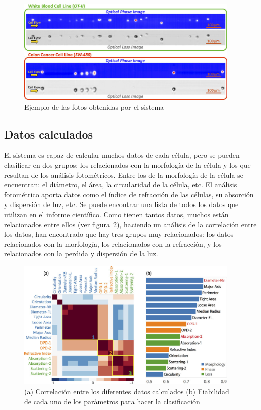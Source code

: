 \documentclass[a4paper, 12pt, UTF8]{article}
\begin{document}
\begin{figure}[H]
	\centering
	\includegraphics[width=0.95\textwidth]{Phase}
	\caption{Ejemplo de las fotos obtenidas por el sistema}
	\label{fig:phase}
\end{figure}

\subsection{Datos calculados}
El sistema es capaz de calcular muchos datos de cada célula, pero se pueden clasificar en dos grupos: los relacionados con la morfología de la célula y los que resultan de los análisis fotométricos. Entre los de la morfología de la célula se encuentran: el diámetro, el área, la circularidad de la célula, etc. El análisis fotométrico aporta datos como el índice de refracción de las células, su absorción y dispersión de luz, etc. Se puede encontrar una lista de todos los datos que utilizan en el informe científico. Como tienen tantos datos, muchos están relacionados entre ellos (ver \hyperref[fig:features]{figura~\ref{fig:features}}), haciendo un análisis de la correlación entre los datos, han encontrado que hay tres grupos muy relacionados: los datos relacionados con la morfología, los relacionados con la refracción, y los relacionados con la perdida y dispersión de la luz.

\begin{figure}[H]
	\centering
	\includegraphics[width=0.95\textwidth]{features}
	\caption{(a) Correlación entre los diferentes datos calculados
		(b) Fiabilidad de cada uno de los paràmetros para hacer la clasificación}
	\label{fig:features}
\end{figure}
\end{document}

